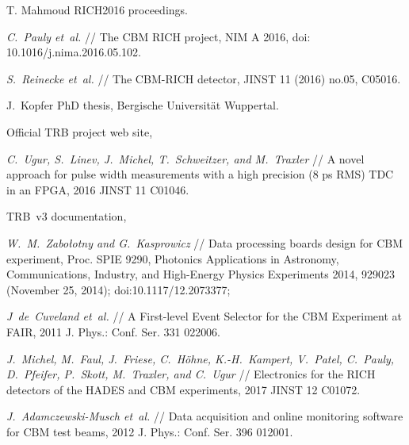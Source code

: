 \begin{thebibliography}{99}
T. Mahmoud RICH2016 proceedings.

\textit{C.~Pauly et~al.} //
The CBM RICH project,
NIM A 2016,
doi: 10.1016/j.nima.2016.05.102.

\textit{S.~Reinecke et~al.} //
The CBM-RICH detector,
JINST 11 (2016) no.05, C05016.

J.~Kopfer PhD thesis, Bergische Universit\"{a}t Wuppertal.


Official TRB project web site,

\textit{C.~Ugur, S.~Linev, J.~Michel, T.~Schweitzer, and M.~Traxler} //
A novel approach for pulse width measurements with a high precision (8 ps RMS) TDC in an FPGA,
2016 JINST 11 C01046.



TRB~v3 documentation,

\textit{W.~M.~Zabołotny and G.~Kasprowicz} //
Data processing boards design for CBM experiment,
Proc. SPIE 9290, Photonics Applications in Astronomy, Communications, Industry, and High-Energy Physics Experiments 2014, 929023 (November 25, 2014); doi:10.1117/12.2073377;

\textit{J~de~Cuveland et~al.} //
A First-level Event Selector for the CBM Experiment at FAIR,
2011 J. Phys.: Conf. Ser. 331 022006.

\textit{J.~Michel, M.~Faul, J.~Friese, C.~H\"{o}hne, K.-H.~Kampert, V.~Patel, C.~Pauly, D.~Pfeifer, P.~Skott, M.~Traxler, and C.~Ugur} //
Electronics for the RICH detectors of the HADES and CBM experiments,
2017 JINST 12 C01072.

\textit{J.~Adamczewski-Musch et~al.} //
Data acquisition and online monitoring software for CBM test beams,
2012 J. Phys.: Conf. Ser. 396 012001.


\end{thebibliography}

